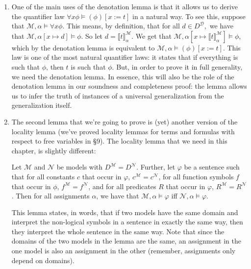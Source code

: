 \begin{enumerate}[\thesection.1]
          \item One of the main uses of the denotation lemma is that it
          allows us to derive the quantifier law $\forall x\phi\vDash
          (\phi)[x:=t]$ in a natural way. To see this, suppose that
          $\mathcal{M},\alpha\vDash \forall x\phi$. This means, by
          definition, that for all $d\in D^\mathcal{D},$ we have that
          $\mathcal{M},\alpha[x\mapsto d]\vDash \phi$. So let
          $d=\llbracket t\rrbracket^\mathcal{M}_\alpha$. We get that
          $\mathcal{M},\alpha[x\mapsto \llbracket
          t\rrbracket^\mathcal{M}_\alpha]\vDash \phi$, which by the
          denotation lemma is equivalent to
          $\mathcal{M},\alpha\vDash(\phi)[x:=t]$. This law is one of
          the most natural quantifier laws: it states that if
          everything is such that $\phi$, then $t$ is such that
          $\phi$. But, in order to prove it in full generality, we
          need the denotation lemma. In essence, this will also be the
          role of the denotation lemma in our soundness and
          completeness proof: the lemma allows us to infer the truth
          of instances of a universal generalization from the
          generalization itself.

          \item The second lemma that we're going to prove is (yet)
            another version of the locality lemma (we've proved
            locality lemmas for terms and formulas with respect to
            free variables in \S9). The locality lemma that we need in
            this chapter, is slightly different:

            \begin{lemma}
              Let $\mathcal{M}$ and $\mathcal{N}$ be models with
              $D^\mathcal{M}=D^\mathcal{N}$. Further, let $\varphi$ be
              a sentence such that for all constants $c$ that occur in
              $\varphi$, $c^\mathcal{M}=c^\mathcal{N}$, for all
              function symbols $f$ that occur in $\phi$,
              $f^\mathcal{M}=f^\mathcal{N}$, and for all
              predicates $R$ that occur in $\varphi$,
              $R^\mathcal{M}=R^\mathcal{N}$. Then for all assignments
              $\alpha$, we have that $\mathcal{M},\alpha\vDash \varphi$ iff
              $\mathcal{N},\alpha\vDash\varphi$.
              
            \end{lemma}
            This lemma states, in words, that if two models have the
            same domain and interpret the non-logical symbols in a
            sentence in exactly the same way, then they interpret the
            whole sentence in the same way. Note that since the domains
            of the two models in the lemma are the same, an assignment
            in the one model is also an assignment in the other
            (remember, assignments only depend on domains).


\end{enumerate}
